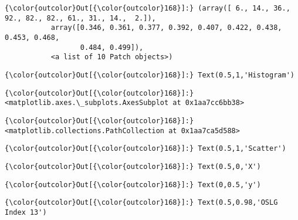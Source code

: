 \documentclass[11pt]{article}
\begin{document}
\begin{Verbatim}[commandchars=\\\{\}]
{\color{outcolor}Out[{\color{outcolor}168}]:} (array([ 6., 14., 36., 92., 82., 82., 61., 31., 14.,  2.]),
           array([0.346, 0.361, 0.377, 0.392, 0.407, 0.422, 0.438, 0.453, 0.468,
                  0.484, 0.499]),
           <a list of 10 Patch objects>)
\end{Verbatim}
            
\begin{Verbatim}[commandchars=\\\{\}]
{\color{outcolor}Out[{\color{outcolor}168}]:} Text(0.5,1,'Histogram')
\end{Verbatim}
            
\begin{Verbatim}[commandchars=\\\{\}]
{\color{outcolor}Out[{\color{outcolor}168}]:} <matplotlib.axes.\_subplots.AxesSubplot at 0x1aa7cc6bb38>
\end{Verbatim}
            
\begin{Verbatim}[commandchars=\\\{\}]
{\color{outcolor}Out[{\color{outcolor}168}]:} <matplotlib.collections.PathCollection at 0x1aa7ca5d588>
\end{Verbatim}
            
\begin{Verbatim}[commandchars=\\\{\}]
{\color{outcolor}Out[{\color{outcolor}168}]:} Text(0.5,1,'Scatter')
\end{Verbatim}
            
\begin{Verbatim}[commandchars=\\\{\}]
{\color{outcolor}Out[{\color{outcolor}168}]:} Text(0.5,0,'X')
\end{Verbatim}
            
\begin{Verbatim}[commandchars=\\\{\}]
{\color{outcolor}Out[{\color{outcolor}168}]:} Text(0,0.5,'y')
\end{Verbatim}
            
\begin{Verbatim}[commandchars=\\\{\}]
{\color{outcolor}Out[{\color{outcolor}168}]:} Text(0.5,0.98,'OSLG Index 13')
\end{Verbatim}
            
\end{document}
